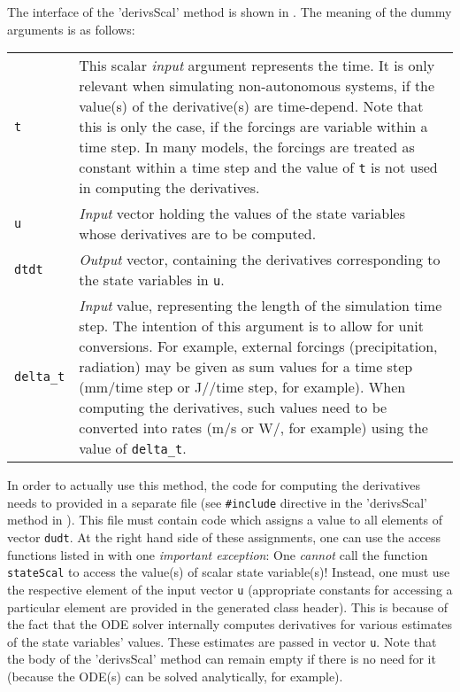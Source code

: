The interface of the 'derivsScal' method is shown in . The meaning of the dummy arguments is as follows:

\begin{tabular}{lp{}}
  \verb!t! & This scalar \emph{input} argument represents the time. It is only relevant when simulating non-autonomous systems, \ie{} if the value(s) of the derivative(s) are time-depend. Note that this is only the case, if the forcings are variable within a time step. In many models, the forcings are treated as constant within a time step and the value of \verb!t! is not used in computing the derivatives. \\
  \verb!u! & \emph{Input} vector holding the values of the state variables whose derivatives are to be computed. \\
  \verb!dtdt! & \emph{Output} vector, containing the derivatives corresponding to the state variables in \verb!u!. \\
  \verb!delta_t! & \emph{Input} value, representing the length of the simulation time step. The intention of this argument is to allow for unit conversions. For example, external forcings (precipitation, radiation) may be given as sum values for a time step (mm/time step or J/\sqm{}/time step, for example). When computing the derivatives, such values need to be converted into rates (m/s or W/\sqm{}, for example) using the value of \verb!delta_t!. \\
\end{tabular}

In order to actually use this method, the code for computing the derivatives needs to provided in a separate file (see \verb!#include! directive in the 'derivsScal' method in ). This file must contain code which assigns a value to all elements of vector \verb!dudt!. At the right hand side of these assignments, one can use the access functions listed in  with one \emph{important exception}: One \emph{cannot} call the function \verb!stateScal! to access the value(s) of scalar state variable(s)! Instead, one must use the respective element of the input vector \verb!u! (appropriate constants for accessing a particular element are provided in the generated class header). This is because of the fact that the ODE solver internally computes derivatives for various estimates of the state variables' values. These estimates are passed in vector \verb!u!. Note that the body of the 'derivsScal' method can remain empty if there is no need for it (because the ODE(s) can be solved analytically, for example).

